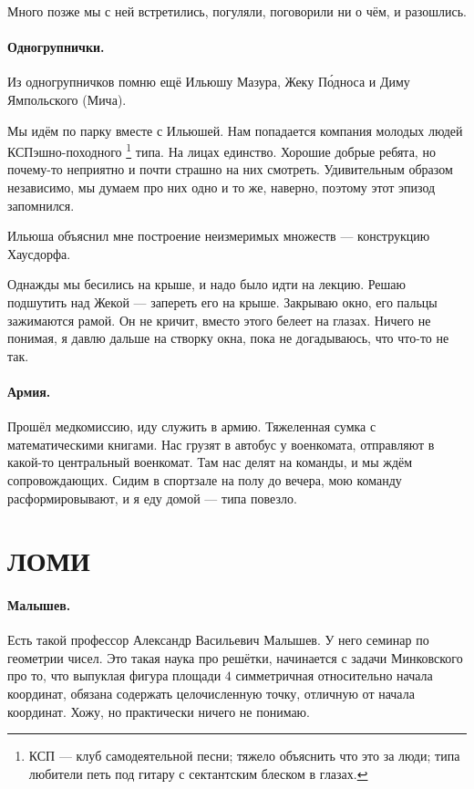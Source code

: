 \documentclass{book}
\begin{document}
Много позже мы с ней встретились, погуляли, поговорили ни о чём, и разошлись.

\paragraph{Одногрупнички.}
Из одногрупничков помню ещё Ильюшу Мазура,
Жеку П\'{о}дноса и Диму Ямпольского (Мича).

Мы идём по парку вместе с Ильюшей.
Нам попадается компания молодых людей КСПэшно-походного%
\footnote{КСП --- клуб самодеятельной песни; тяжело объяснить что это за люди; 
типа любители петь под гитару с сектантским блеском в глазах.}
типа.
На лицах единство.
Хорошие добрые ребята, 
но почему-то неприятно и почти страшно на них смотреть.
Удивительным образом независимо, мы думаем про них одно и то же,
наверно, поэтому этот эпизод запомнился.

Ильюша объяснил мне построение неизмеримых множеств ---
конструкцию Хаусдорфа.

Однажды мы бесились на крыше, и надо было идти на лекцию.
Решаю подшутить над Жекой --- запереть его на крыше.
Закрываю окно, 
его пальцы зажимаются рамой.
Он не кричит, вместо этого белеет на глазах.
Ничего не понимая, я давлю дальше на створку окна, 
пока не догадываюсь, что что-то не так.

\paragraph{Армия.}
Прошёл медкомиссию, иду служить в армию.
Тяжеленная сумка с математическими книгами.
Нас грузят в автобус у военкомата, отправляют в какой-то центральный военкомат.
Там нас делят на команды, и мы ждём сопровождающих.
Сидим в спортзале на полу до вечера, мою команду расформировывают, и я еду домой --- типа повезло.

\section*{ЛОМИ}

\paragraph{Малышев.}
Есть такой профессор Александр Васильевич Малышев. 
У него семинар по геометрии чисел.
Это такая наука про решётки, начинается с задачи Минковского про то, что выпуклая фигура площади $4$ симметричная относительно начала координат, обязана содержать целочисленную точку, отличную от начала координат.
Хожу, но практически ничего не понимаю.
\end{document}
